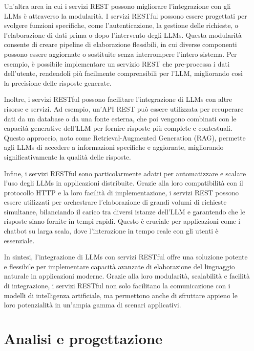 \documentclass[a4paper,twoside,12pt]{toptesi}
\begin{document}
Un'altra area in cui i servizi REST possono migliorare l'integrazione con gli LLMs è attraverso la modularità. I servizi RESTful possono essere progettati per svolgere funzioni specifiche, come l'autenticazione, la gestione delle richieste, o l'elaborazione di dati prima o dopo l'intervento degli LLMs. Questa modularità consente di creare pipeline di elaborazione flessibili, in cui diverse componenti possono essere aggiornate o sostituite senza interrompere l'intero sistema. Per esempio, è possibile implementare un servizio REST che pre-processa i dati dell'utente, rendendoli più facilmente comprensibili per l'LLM, migliorando così la precisione delle risposte generate.

Inoltre, i servizi RESTful possono facilitare l'integrazione di LLMs con altre risorse e servizi. Ad esempio, un'API REST può essere utilizzata per recuperare dati da un database o da una fonte esterna, che poi vengono combinati con le capacità generative dell'LLM per fornire risposte più complete e contestuali. Questo approccio, noto come Retrieval-Augmented Generation (RAG), permette agli LLMs di accedere a informazioni specifiche e aggiornate, migliorando significativamente la qualità delle risposte.

Infine, i servizi RESTful sono particolarmente adatti per automatizzare e scalare l'uso degli LLMs in applicazioni distribuite. Grazie alla loro compatibilità con il protocollo HTTP e la loro facilità di implementazione, i servizi REST possono essere utilizzati per orchestrare l'elaborazione di grandi volumi di richieste simultanee, bilanciando il carico tra diversi istanze dell'LLM e garantendo che le risposte siano fornite in tempi rapidi. Questo è cruciale per applicazioni come i chatbot su larga scala, dove l'interazione in tempo reale con gli utenti è essenziale.

In sintesi, l'integrazione di LLMs con servizi RESTful offre una soluzione potente e flessibile per implementare capacità avanzate di elaborazione del linguaggio naturale in applicazioni moderne. Grazie alla loro modularità, scalabilità e facilità di integrazione, i servizi RESTful non solo facilitano la comunicazione con i modelli di intelligenza artificiale, ma permettono anche di sfruttare appieno le loro potenzialità in un'ampia gamma di scenari applicativi.


\chapter{Analisi e progettazione}
\end{document}

